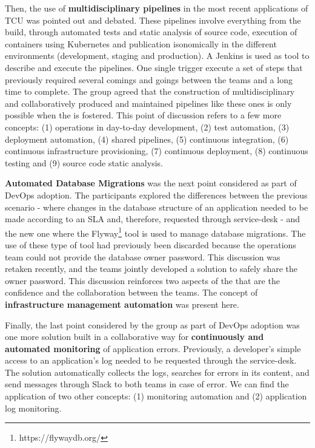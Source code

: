{Then, the use of \textbf{multidisciplinary pipelines} in the most recent applications of
TCU was pointed out and debated. These pipelines involve everything from the
build, through automated tests and static analysis of source code, execution of
containers using Kubernetes and publication isonomically in the different
environments (development, staging and production). A Jenkins is used as tool
to describe and execute the pipelines. One single trigger execute a set of
steps that previously required several comings and goings between the teams and
a long time to complete. The group agreed that the construction of multidisciplinary
and collaboratively produced and maintained pipelines like these ones is only
possible when the \cc is fostered. This point of discussion refers to a few
more concepts: (1) operations in day-to-day development, (2) test automation,
(3) deployment automation, (4) shared pipelines, (5) continuous integration,
(6) continuous infrastructure provisioning, (7) continuous deployment,
(8) continuous testing and (9) source code static analysis.

\textbf{Automated Database Migrations} was the next point considered as part of
DevOps adoption. The participants explored the differences between the previous
scenario - where changes in the database structure of an application needed to be
made according to an SLA and, therefore, requested through service-desk - and
the new one where the Flyway\footnote{https://flywaydb.org/} tool is used to
manage database migrations. The use of these type of tool had previously been
discarded because the operations team could not provide the database owner
password. This discussion was retaken recently, and the teams jointly developed
a solution to safely share the owner password. This discussion reinforces two
aspects of the \cc that are the confidence and the collaboration between the
teams. The concept of \textbf{infrastructure management automation} was present
here.

Finally, the last point considered by the group as part of DevOps adoption was
one more solution built in a collaborative way for \textbf{continuously and automated
monitoring} of application errors. Previously, a developer's simple access
to an application's log needed to be requested through the service-desk. The
solution automatically collects the logs, searches for errors in its content,
and send messages through Slack to both teams in case of error. We can find
the application of two other concepts: (1) monitoring automation and
(2) application log monitoring.

}

